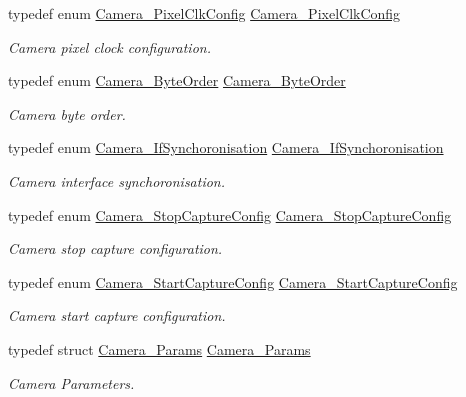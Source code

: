 \begin{DoxyCompactItemize}
typedef enum \hyperlink{_camera_8h_a081a0e4af0b04d76a5476d22e6cf8657}{Camera\+\_\+\+Pixel\+Clk\+Config} \hyperlink{_camera_8h_a844022cef41a1a6df47b87ec46f8d658}{Camera\+\_\+\+Pixel\+Clk\+Config}
\begin{DoxyCompactList}\small\item\em Camera pixel clock configuration. \end{DoxyCompactList}\item 
typedef enum \hyperlink{_camera_8h_ae5c1282ca99dd27ba0faf0f16f6e9904}{Camera\+\_\+\+Byte\+Order} \hyperlink{_camera_8h_ae04f64f1517285b35f56ac4f3ae6008f}{Camera\+\_\+\+Byte\+Order}
\begin{DoxyCompactList}\small\item\em Camera byte order. \end{DoxyCompactList}\item 
typedef enum \hyperlink{_camera_8h_a741d469cc903899255a1d3e76fdce47b}{Camera\+\_\+\+If\+Synchoronisation} \hyperlink{_camera_8h_af205d344ecb59e656c640241783ddf6c}{Camera\+\_\+\+If\+Synchoronisation}
\begin{DoxyCompactList}\small\item\em Camera interface synchoronisation. \end{DoxyCompactList}\item 
typedef enum \hyperlink{_camera_8h_a783564f838bc718a5b56f114027f5185}{Camera\+\_\+\+Stop\+Capture\+Config} \hyperlink{_camera_8h_a8b5e3682ad3dca8fd314d7a09e374a68}{Camera\+\_\+\+Stop\+Capture\+Config}
\begin{DoxyCompactList}\small\item\em Camera stop capture configuration. \end{DoxyCompactList}\item 
typedef enum \hyperlink{_camera_8h_a97037da7c87b817ddb71ec7100c69ca5}{Camera\+\_\+\+Start\+Capture\+Config} \hyperlink{_camera_8h_a997e6ea5651105da0ee6f8f473e246dd}{Camera\+\_\+\+Start\+Capture\+Config}
\begin{DoxyCompactList}\small\item\em Camera start capture configuration. \end{DoxyCompactList}\item 
typedef struct \hyperlink{struct_camera___params}{Camera\+\_\+\+Params} \hyperlink{_camera_8h_af493a9fc2ad7b908176dafd7dc39d167}{Camera\+\_\+\+Params}
\begin{DoxyCompactList}\small\item\em Camera Parameters. \end{DoxyCompactList}\item 

\end{DoxyCompactItemize}

